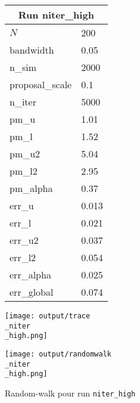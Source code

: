 
\begin{figure}[H]
  \centering
  \begin{minipage}[t]{0.45\textwidth}
    \vspace{0pt}
    \footnotesize
    \begin{tabular}{|l|l|}\hline
    \multicolumn{2}{|c|}{\textbf{Run niter\_high}} \\ \hline
    $N$ & 200 \\ \hline
    bandwidth & 0.05 \\ \hline
    n\_sim & 2000 \\ \hline
    proposal\_scale & 0.1 \\ \hline
    n\_iter & 5000 \\ \hline
    pm\_u & 1.01 \\ \hline
    pm\_l & 1.52 \\ \hline
    pm\_u2 & 5.04 \\ \hline
    pm\_l2 & 2.95 \\ \hline
    pm\_alpha & 0.37 \\ \hline
    err\_u & 0.013 \\ \hline
    err\_l & 0.021 \\ \hline
    err\_u2 & 0.037 \\ \hline
    err\_l2 & 0.054 \\ \hline
    err\_alpha & 0.025 \\ \hline
    err\_global & 0.074 \\ \hline
    \end{tabular}
  \end{minipage}
  \hfill
  \begin{minipage}[t]{0.45\textwidth}
    \vspace{0pt}
    \texttt{[image: output/trace\\\_niter\\\_high.png]}
  \end{minipage}
\end{figure}

\begin{figure}[H]
  \centering
  \texttt{[image: output/randomwalk\\\_niter\\\_high.png]}
  \caption{Random-walk pour run \texttt{niter\_high}}
\end{figure}

